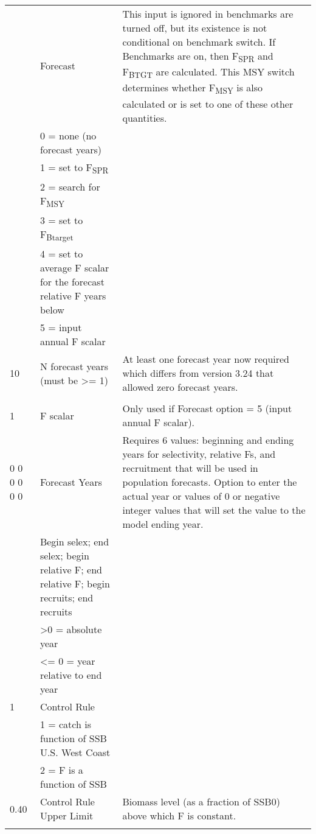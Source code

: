 \begin{landscape}
\begin{longtable}{p{3cm} p{7cm} p{11cm}}
  \pagebreak
  2 & Forecast & \multirow{1}{1cm}[-0.1cm]{\parbox{11cm }{ This input is ignored in benchmarks are turned off, but its existence is not conditional on benchmark switch.  If Benchmarks are on, then F\textsubscript{SPR} and F\textsubscript{BTGT} are calculated.  This MSY switch determines whether F\textsubscript{MSY} is also calculated or is set to one of these other quantities.}} \\
    & 0 = none (no forecast years) & \\
    & 1 = set to F\textsubscript{SPR} & \\
    & 2 = search for F\textsubscript{MSY} & \\
    & 3 = set to F\textsubscript{Btarget} & \\
    & 4 = set to average F scalar for the forecast relative F years below & \\
    & 5 = input annual F scalar & \\
    
  \hline
  10 & N forecast years (must be >= 1) &  \multirow{1}{1cm}[-0.1cm]{\parbox{11cm }{ At least one forecast year now required which differs from version 3.24 that allowed zero forecast years.}} \\
     & & \\
     
  \hline
  1 & F scalar & \multirow{1}{1cm}[-0.1cm]{\parbox{11cm}{Only used if Forecast option = 5 (input annual F scalar).}}\\
  
  \hline
  0 0 0 0 0 0 & Forecast Years &  \multirow{1}{1cm}[-0.1cm]{\parbox{11cm}{Requires 6 values:  beginning and ending years for selectivity, relative Fs, and recruitment that will be used in population forecasts.  Option to enter the actual year or values of 0 or negative integer values that will set the value to the model ending year.}}\\
    & Begin selex; end selex; begin relative F; end relative F; begin recruits; end recruits & \\
    & >0 = absolute year & \\
    & <= 0 = year relative to end year & \\
  
 \hline   
 1 & Control Rule & \\
   & 1 = catch is function of SSB U.S. West Coast & \\
   & 2 = F is a function of SSB & \\
   
 \hline
 0.40 & Control Rule Upper Limit & \multirow{1}{1cm}[-0.1cm]{\parbox{11cm}{Biomass level (as a fraction of SSB0) above which F is constant.}} \\
   &  & \\
 

\end{longtable}
\end{landscape}
